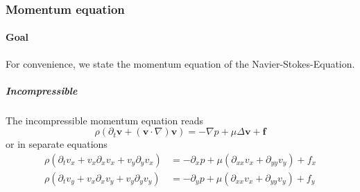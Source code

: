 \documentclass{article}
\begin{document}
\subsubsection{Momentum equation}
\label{subs:Momentum equation}
\paragraph{Goal}
\label{par:Goal}
For convenience, we state the momentum equation of the Navier-Stokes-Equation.

\subparagraph{Incompressible}
\label{subp:Incompressible}
The incompressible momentum equation reads
\begin{equation}
  \rho \left(\partial_t \mathbf{v} + \left(\mathbf{v}\cdot\nabla\right)\mathbf{v} \right) = -\nabla p + \mu \Delta \mathbf{v} + \mathbf{f}
\end{equation}
or in separate equations
\begin{equation}
  \begin{aligned}
    \rho \left(\partial_t v_x + v_x \partial_x v_x + v_y \partial_y v_x  \right)
    &= - \partial_x p + \mu (\partial_{xx} v_x + \partial_{yy} v_y) + f_x \\
    \rho \left(\partial_t v_y + v_x \partial_x v_y + v_y \partial_y v_y  \right)
    &= - \partial_y p + \mu (\partial_{xx} v_x + \partial_{yy} v_y) + f_y
  \end{aligned}
\end{equation}
\end{document}
